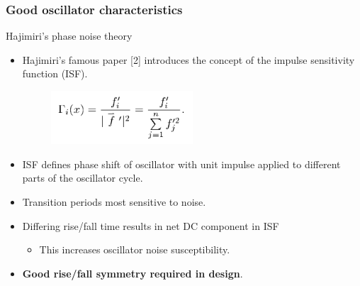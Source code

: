 \documentclass[t, screen, aspectratio=43]{beamer}
\begin{document}
\begin{frame}
	\frametitle{Good oscillator characteristics}
	\begin{block}{Hajimiri's phase noise theory}
		\begin{minipage}{6cm}
			\vspace{1em}
			\tiny

			\begin{itemize}[itemsep=4pt,label=\protect---]
				\item Hajimiri's famous paper [2] introduces the concept of the impulse sensitivity function (ISF).
				\begin{figure}[htb!]
				        \centering
				        \includegraphics[width=0.5\textwidth, angle=0]{isf_func}
				\end{figure}
				\item ISF defines phase shift of oscillator with unit impulse applied to different parts of the oscillator cycle.
				\item Transition periods most sensitive to noise.
				\item Differing rise/fall time results in net DC component in ISF
				\begin{itemize}[itemsep=4pt,label=$\bullet$]
					\item This increases oscillator noise susceptibility.
				\end{itemize}
				\item \textbf{\color{red}Good rise/fall symmetry required in design}.
			\end{itemize}


\end{minipage}
\end{block}
\end{frame}
\end{document}

